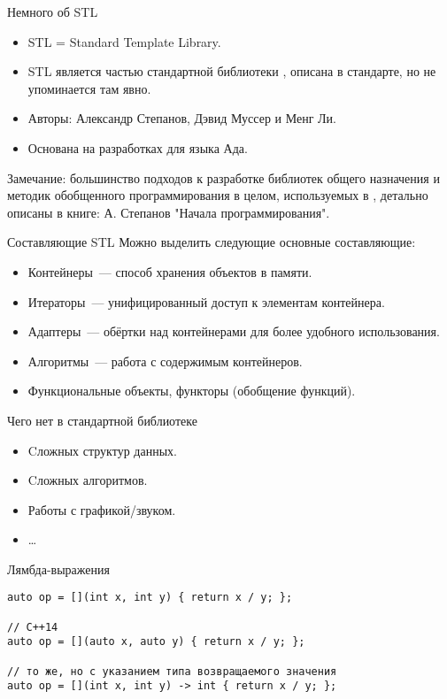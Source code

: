 \documentclass{beamer}
\begin{document}
\begin{frame}{Немного об STL}
    \begin{itemize}
        \item STL = Standard Template Library.
        \item STL является частью стандартной библиотеки \langcpp, описана в стандарте, но не упоминается там явно.
        \item Авторы: Александр Степанов, Дэвид Муссер и Менг Ли.
        \item Основана на разработках для языка Ада.
    \end{itemize}
    Замечание: большинство подходов к разработке библиотек общего назначения и методик обобщенного программирования в целом, 
        используемых в \langcpp, детально описаны в книге: А. Степанов "Начала программирования".
\end{frame}

\begin{frame}{Составляющие STL}
    Можно выделить следующие основные составляющие:
    \begin{itemize}
        \item Контейнеры~--- способ хранения объектов в памяти.
        \item Итераторы~--- унифицированный доступ к элементам контейнера.
        \item Адаптеры~--- обёртки над контейнерами для более удобного использования.
        \item Алгоритмы~--- работа с содержимым контейнеров.
        \item Функциональные объекты, функторы (обобщение функций).
    \end{itemize}
\end{frame}

\begin{frame}{Чего нет в стандартной библиотеке}{}
    \begin{itemize}
        \item Cложных структур данных.
        \item Cложных алгоритмов.
        \item Работы с графикой/звуком.
        \item \dots
    \end{itemize}
\end{frame}

\begin{frame}[fragile]{Лямбда-выражения}
    \begin{lstlisting}
auto op = [](int x, int y) { return x / y; };

// С++14
auto op = [](auto x, auto y) { return x / y; };

// то же, но с указанием типа возвращаемого значения
auto op = [](int x, int y) -> int { return x / y; };
    \end{lstlisting}
\end{frame}
\end{document}
